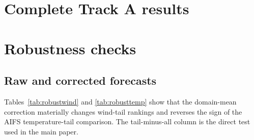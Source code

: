 \section{Complete Track A results}\label{app:tracka}

\begin{table}[h]
\caption{Bias-corrected Track A MAE skill (\%) against IFS, 6--48\,h, by
wind regime. Parentheses give leave-one-month-out jackknife standard errors.}
\label{tab:skillwind}
\centering\small\resizebox{\textwidth}{!}{}
\end{table}

\begin{table}[h]
\caption{Bias-corrected Track A MAE skill (\%) against IFS, 6--48\,h, by
temperature regime.}
\label{tab:skilltemp}
\centering\small\resizebox{\textwidth}{!}{}
\end{table}

\begin{table}[h]
\caption{Bias-corrected Track A solar MAE skill (\%) against IFS,
1--48\,h, by regime.}
\label{tab:skillsolar}
\centering\small\resizebox{\textwidth}{!}{}
\end{table}

\begin{table}[h]
\caption{Track A MAE skill (\%) by lead for 10\,m wind.}
\label{tab:leadwind}
\centering\small\resizebox{\textwidth}{!}{}
\end{table}

\begin{table}[h]
\caption{Track A MAE skill (\%) by lead for 2\,m temperature.}
\label{tab:leadtemp}
\centering\small\resizebox{\textwidth}{!}{}
\end{table}

\begin{table}[h]
\caption{Track A MAE skill (\%) by lead for solar radiation.}
\label{tab:leadsolar}
\centering\small\resizebox{\textwidth}{!}{}
\end{table}

\section{Robustness checks}\label{app:robustness}

\subsection{Raw and corrected forecasts}
Tables~\ref{tab:robustwind} and \ref{tab:robusttemp} show that the
domain-mean correction materially changes wind-tail rankings and reverses the
sign of the AIFS temperature-tail comparison. The tail-minus-all column is
the direct test used in the main paper.

